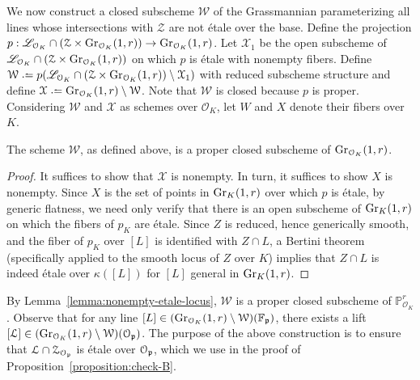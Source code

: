 We now construct a closed subscheme $\mathcal W$ of the Grassmannian parameterizing all lines whose intersections with $\mathcal Z$ are not \'etale over the base.
Define the projection $p: \mathscr L_{\mathcal O_K} \cap ( \mathcal Z \times \operatorname{Gr}_{\mathcal O_K}(1,r) ) \rightarrow \operatorname{Gr}_{\mathcal O_K}(1,r)$.
Let $\mathcal X_1$ be the open subscheme of $\mathscr L_{\mathcal O_K} \cap ( \mathcal Z \times \operatorname{Gr}_{\mathcal O_K}(1,r))$
on which $p$ is \'etale with nonempty fibers.
Define $\mathcal W \defeq  p(\mathscr L_{\mathcal O_K} \cap (\mathcal Z \times \gr {\mathcal O_K}(1,r) ) \setminus \mathcal X_1)$ with reduced subscheme structure and define
$\mathcal X \defeq \gr{\mathcal O_K}(1,r) \setminus \mathcal W$. Note that $\mathcal W$ is closed because $p$ is proper.
Considering $\mathcal W$ and $\mathcal X$ as schemes over $\mathcal O_K$, let $W$ and $X$ denote their fibers over $K$.

\begin{lemma}
	\label{lemma:nonempty-etale-locus}
	The scheme $\mathcal W$, as defined above, is a proper closed subscheme of $\operatorname{Gr}_{\mathcal O_K}(1,r)$.
\end{lemma}
\begin{proof}
It suffices to show that $\mathcal X$ is nonempty. In turn, it suffices to show $X$ is nonempty.
Since $X$ is the set of points in $\operatorname{Gr}_{K}(1,r)$ over which $p$ is \'etale,
by generic flatness, we need only verify that there is an open
subscheme of $\operatorname{Gr}_{K}(1,r)$ on which the fibers of $p_K$ are \'etale.
Since $Z$ is reduced, hence generically smooth,
and the fiber of $p_K$ over $[L]$ is identified with
$Z \cap L$, a Bertini theorem (specifically
\cite[Theoreme I.6.10(2)]{jouanolou1982theoremes}
applied to the smooth locus of $Z$ over $K$)
implies that $Z \cap L$ is indeed \'etale over $\kappa([L])$ for $[L]$ general in $\operatorname{Gr}_{K}(1,r)$.
\end{proof}

\begin{remark}
	\label{remark:exists-line}
By Lemma~\ref{lemma:nonempty-etale-locus}, $\mathcal W$ is a proper closed subscheme of $\mathbb P^r_{\mathcal O_K}$.
	Observe that for any line $[L] \in (\operatorname{Gr}_{\mathcal O_K}(1,r) \setminus \mathcal W)(\mathbb F_\mathfrak p)$, there exists a lift $[\mathcal L] \in (\operatorname{Gr}_{\mathcal O_K}(1,r) \setminus \mathcal W)(\mathcal O_\mathfrak p)$.
The purpose of the above construction is to ensure that $\mathcal L \cap \mathcal Z_{\mathcal O_\mathfrak p}$ is \'etale over $\mathcal O_\mathfrak p$,
which we use in the proof of Proposition~\ref{proposition:check-B}.
\end{remark}


